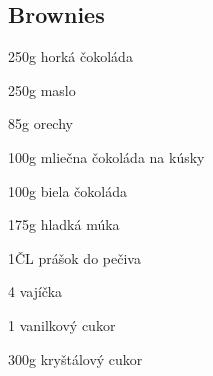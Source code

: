\setcounter{step}{0}
\subsection{Brownies}

\begin{ingredient}
\begin{main}
	\item 250g horká čokoláda
	\item 250g maslo
	\item 85g orechy
	\item 100g mliečna čokoláda na kúsky
	\item 100g biela čokoláda
	\item 175g hladká múka
	\item 1ČL prášok do pečiva
	\item 4 vajíčka
	\item 1 vanilkový cukor
	\item 300g kryštálový cukor
\end{main}
\end{ingredient}%
\begin{recipe}


\end{recipe}

\begin{notes}

\end{notes}	